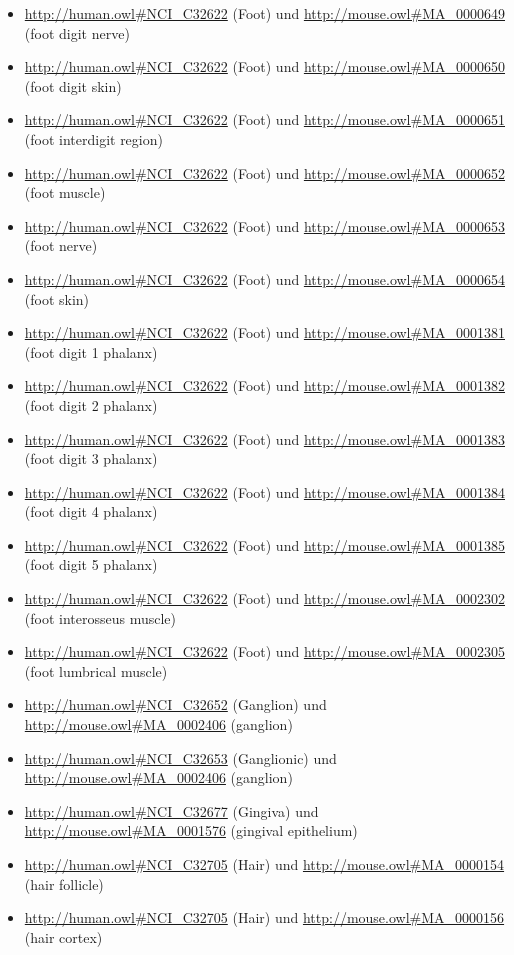 \begin{itemize}
	\item \url{http://human.owl#NCI_C32622} (Foot) und \url{http://mouse.owl#MA_0000649} (foot digit nerve)
	\item \url{http://human.owl#NCI_C32622} (Foot) und \url{http://mouse.owl#MA_0000650} (foot digit skin)
	\item \url{http://human.owl#NCI_C32622} (Foot) und \url{http://mouse.owl#MA_0000651} (foot interdigit region)
	\item \url{http://human.owl#NCI_C32622} (Foot) und \url{http://mouse.owl#MA_0000652} (foot muscle)
	\item \url{http://human.owl#NCI_C32622} (Foot) und \url{http://mouse.owl#MA_0000653} (foot nerve)
	\item \url{http://human.owl#NCI_C32622} (Foot) und \url{http://mouse.owl#MA_0000654} (foot skin)
	\item \url{http://human.owl#NCI_C32622} (Foot) und \url{http://mouse.owl#MA_0001381} (foot digit 1 phalanx)
	\item \url{http://human.owl#NCI_C32622} (Foot) und \url{http://mouse.owl#MA_0001382} (foot digit 2 phalanx)
	\item \url{http://human.owl#NCI_C32622} (Foot) und \url{http://mouse.owl#MA_0001383} (foot digit 3 phalanx)
	\item \url{http://human.owl#NCI_C32622} (Foot) und \url{http://mouse.owl#MA_0001384} (foot digit 4 phalanx)
	\item \url{http://human.owl#NCI_C32622} (Foot) und \url{http://mouse.owl#MA_0001385} (foot digit 5 phalanx)
	\item \url{http://human.owl#NCI_C32622} (Foot) und \url{http://mouse.owl#MA_0002302} (foot interosseus muscle)
	\item \url{http://human.owl#NCI_C32622} (Foot) und \url{http://mouse.owl#MA_0002305} (foot lumbrical muscle)
	\item \url{http://human.owl#NCI_C32652} (Ganglion\textunderscoreCell\textunderscoreLayer) und \url{http://mouse.owl#MA_0002406} (ganglion)
	\item \url{http://human.owl#NCI_C32653} (Ganglionic\textunderscoreLayer) und \url{http://mouse.owl#MA_0002406} (ganglion)
	\item \url{http://human.owl#NCI_C32677} (Gingiva) und \url{http://mouse.owl#MA_0001576} (gingival epithelium)
	\item \url{http://human.owl#NCI_C32705} (Hair) und \url{http://mouse.owl#MA_0000154} (hair follicle)
	\item \url{http://human.owl#NCI_C32705} (Hair) und \url{http://mouse.owl#MA_0000156} (hair cortex)

\end{itemize}

